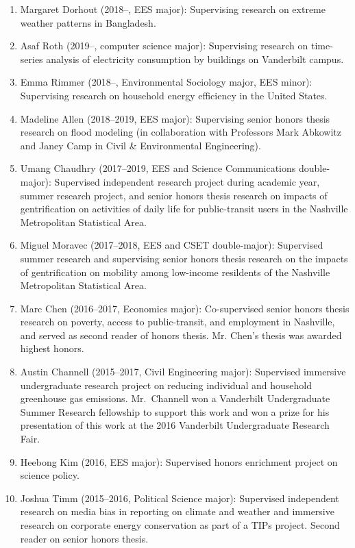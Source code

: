 \documentclass[10pt]{article}
\begin{document}
    \begin{enumerate}
    \item Margaret Dorhout (2018--, EES major): Supervising research on extreme weather patterns in Bangladesh.
    \item Asaf Roth (2019--, computer science major): Supervising research on time-series analysis of electricity consumption by buildings on Vanderbilt campus.
    \item Emma Rimmer (2018--, Environmental Sociology major, EES minor): Supervising research on household energy efficiency in the United States.
    \item Madeline Allen (2018--2019, EES major): Supervising senior honors thesis research on flood modeling (in collaboration with Professors Mark Abkowitz and Janey Camp in Civil \& Environmental Engineering).
    \item Umang Chaudhry (2017--2019, EES and Science Communications double-major): Supervised independent research project during academic year, summer research project, and senior honors thesis research on impacts of gentrification on activities of daily life
    for public-transit users in the Nashville Metropolitan Statistical Area.
    \item Miguel Moravec (2017--2018, EES and CSET double-major): Supervised summer research and supervising senior honors thesis research on the impacts of gentrification on mobility among low-income resildents of the Nashville Metropolitan Statistical Area.
    \item Marc Chen (2016--2017, Economics major): Co-supervised senior honors thesis research on poverty, access to public-transit, and employment in Nashville, and served as second reader of honors thesis. Mr. Chen's thesis was awarded highest honors.
    \item Austin Channell (2015--2017, Civil Engineering major): Supervised immersive undergraduate research project on reducing individual and household greenhouse gas emissions.
    Mr.~Channell won a Vanderbilt Undergraduate Summer Research fellowship to support this work and won a prize for his presentation of this work at the 2016 Vanderbilt Undergraduate Research Fair.
    \item Heebong Kim (2016, EES major): Supervised honors enrichment project on science policy.
    \item Joshua Timm (2015--2016, Political Science major): Supervised independent research on media bias in reporting on climate and weather and immersive research on corporate energy conservation as part of a TIPs project. Second reader on senior honors thesis.

\end{enumerate}
\end{document}
